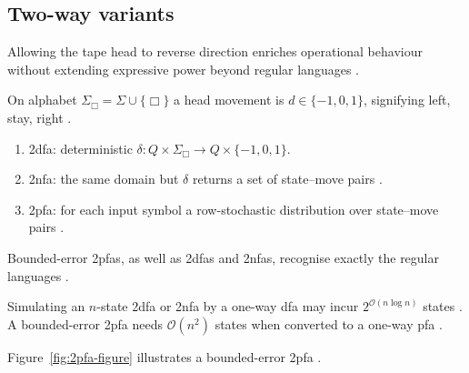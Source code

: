 \subsection{Two-way variants}\label{subsec:two-way}

Allowing the tape head to reverse direction enriches operational
behaviour without extending expressive power beyond regular languages
\cite{Shepherdson1959}.

\begin{definition}\label{def:two-way-head}
On alphabet $\Sigma_{\Box}=\Sigma\cup\{\Box\}$ a head movement is
$d\in\{-1,0,1\}$, signifying left, stay, right
\cite{Shepherdson1959}.
\end{definition}

\begin{definition}\label{def:2dfa2nfa2pfa}
\begin{enumerate}
\item \gls{2dfa}: deterministic
$\delta\colon Q{\times}\Sigma_{\Box}\to Q{\times}\{-1,0,1\}$.
\item \gls{2nfa}: the same domain but $\delta$ returns a set of
state–move pairs \cite{RabinScott1959}.
\item \gls{2pfa}: for each input symbol a row-stochastic distribution
over state–move pairs \cite{Freivalds1982}.
\end{enumerate}
\end{definition}

\begin{theorem}\label{thm:two-way-reg}
Bounded-error \glspl{2pfa}, as well as \glspl{2dfa} and \glspl{2nfa},
recognise exactly the regular languages
\cite{Freivalds1982,Shepherdson1959}.
\end{theorem}

\begin{proposition}\label{prop:two-way-cost}
Simulating an \(n\)-state \gls{2dfa} or \gls{2nfa} by a one-way
\gls{dfa} may incur \(2^{\mathcal{O}(n\log n)}\) states
\cite{Shepherdson1959,RabinScott1959}.  
A bounded-error \gls{2pfa} needs $\mathcal{O}(n^{2})$ states when
converted to a one-way \gls{pfa} \cite{DworkStockmeyer1992}.
\end{proposition}

\begin{example}\label{ex:2pfa-sketch}
Figure~\ref{fig:2pfa-figure} illustrates a bounded-error
\gls{2pfa} \cite{Freivalds1982}.
\end{example}

